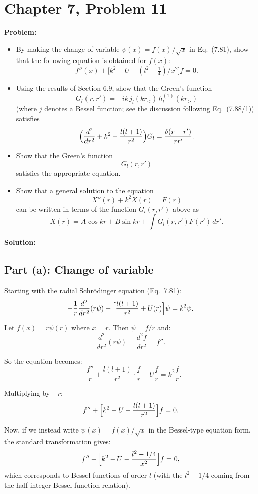 \documentclass[12pt]{article}
\begin{document}
\section*{Chapter 7, Problem 11}

\textbf{Problem:}
\begin{itemize}
\item[a)] By making the change of variable $\psi(x) = f(x)/\sqrt{x}$ in Eq.\ (7.81), show that the following equation is obtained for $f(x)$:
\[
f''(x) + \bigl[k^2 - U - (l^2 - \tfrac{1}{4})/x^2\bigr]f = 0.
\]
\item[b)] Using the results of Section 6.9, show that the Green's function
\[
G_l(r,r') = -ik\,j_l(kr_<)\,h_l^{(1)}(kr_>)
\]
(where $j$ denotes a Bessel function; see the discussion following Eq.\ (7.88/1)) satisfies
\[
\Bigl(\frac{d^2}{dr^2} + k^2 - \frac{l(l+1)}{r^2}\Bigr)G_l = \frac{\delta(r-r')}{rr'}.
\]
\item[a)] Show that the Green's function
\[
G_l(r,r')
\]
satisfies the appropriate equation.
\item[b)] Show that a general solution to the equation
\[
X''(r) + k^2 X(r) = F(r)
\]
can be written in terms of the function $G_l(r,r')$ above as
\[
X(r) = A\cos kr + B\sin kr + \int G_l(r,r')F(r')\,dr'.
\]
\end{itemize}

\bigskip
\textbf{Solution:}

\subsection*{Part (a): Change of variable}

Starting with the radial Schr\"odinger equation (Eq.\ 7.81):
\[
-\frac{1}{r}\frac{d^2}{dr^2}(r\psi) + \Bigl[\frac{l(l+1)}{r^2} + U(r)\Bigr]\psi = k^2\psi.
\]

Let $f(x) = r\psi(r)$ where $x = r$. Then $\psi = f/r$ and:
\[
\frac{d^2}{dr^2}(r\psi) = \frac{d^2 f}{dr^2} = f''.
\]

So the equation becomes:
\[
-\frac{f''}{r} + \frac{l(l+1)}{r^2}\cdot\frac{f}{r} + U\frac{f}{r} = k^2\frac{f}{r}.
\]

Multiplying by $-r$:
\[
f'' + \Bigl[k^2 - U - \frac{l(l+1)}{r^2}\Bigr]f = 0.
\]

Now, if we instead write $\psi(x) = f(x)/\sqrt{x}$ in the Bessel-type equation form, the standard transformation gives:
\[
f'' + \Bigl[k^2 - U - \frac{l^2 - 1/4}{x^2}\Bigr]f = 0,
\]
which corresponds to Bessel functions of order $l$ (with the $l^2 - 1/4$ coming from the half-integer Bessel function relation).
\end{document}
